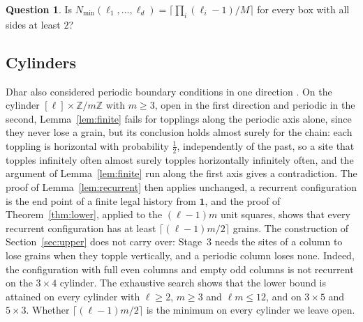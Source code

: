 \documentclass[11pt]{amsart}
\theoremstyle{definition}
\newtheorem{question}[theorem]{Question}
\newcommand{\ZZ}{\mathbb{Z}}
\newcommand{\one}{\mathbf 1}
\newcommand{\Nmin}{N_{\min}}
\begin{document}
\begin{question}
Is $\Nmin(\ell_1,\dots,\ell_d)=\bigl\lceil\prod_i(\ell_i-1)/M\bigr\rceil$ for every box with all sides at least $2$?
\end{question}

\subsection{Cylinders}
Dhar also considered periodic boundary conditions in one direction \cite[\S\S3--4]{Dha99b}. On the cylinder $[\ell]\times\ZZ/m\ZZ$ with $m\ge3$, open in the first direction and periodic in the second, Lemma~\ref{lem:finite} fails for topplings along the periodic axis alone, since they never lose a grain, but its conclusion holds almost surely for the chain: each toppling is horizontal with probability $\tfrac12$, independently of the past, so a site that topples infinitely often almost surely topples horizontally infinitely often, and the argument of Lemma~\ref{lem:finite} run along the first axis gives a contradiction. The proof of Lemma~\ref{lem:recurrent} then applies unchanged, a recurrent configuration is the end point of a finite legal history from $\one$, and the proof of Theorem~\ref{thm:lower}, applied to the $(\ell-1)m$ unit squares, shows that every recurrent configuration has at least $\lceil(\ell-1)m/2\rceil$ grains. The construction of Section~\ref{sec:upper} does not carry over: Stage~3 needs the sites of a column to lose grains when they topple vertically, and a periodic column loses none. Indeed, the configuration with full even columns and empty odd columns is not recurrent on the $3\times4$ cylinder. The exhaustive search shows that the lower bound is attained on every cylinder with $\ell\ge2$, $m\ge3$ and $\ell m\le12$, and on $3\times5$ and $5\times3$. Whether $\lceil(\ell-1)m/2\rceil$ is the minimum on every cylinder we leave open.
\end{document}

